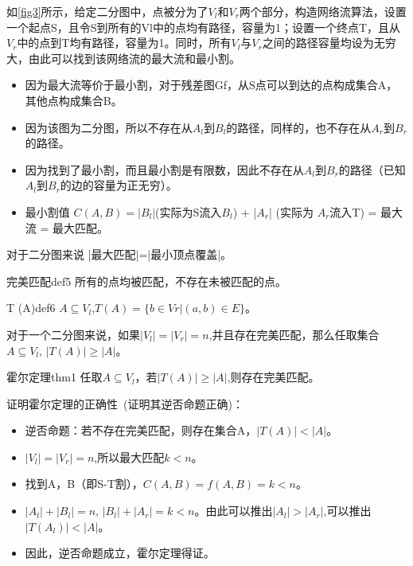 \begin{example}
  如\autoref{fig3}所示，给定二分图中，点被分为了\(V_l\)和\(V_r\)两个部分，构造网络流算法，设置一个起点S，且令S到所有的Vl中的点均有路径，容量为1；设置一个终点T，且从\(V_r\)中的点到T均有路径，容量为1。同时，所有\(V_l\)与\(V_r\)之间的路径容量均设为无穷大，由此可以找到该网络流的最大流和最小割。
\end{example}

\begin{itemize}
  \item 因为最大流等价于最小割，对于残差图Gf，从S点可以到达的点构成集合A，其他点构成集合B。
  \item 因为该图为二分图，所以不存在从\(A_l\)到\(B_l\)的路径，同样的，也不存在从\(A_r\)到\(B_r\)的路径。
  \item 因为找到了最小割，而且最小割是有限数，因此不存在从\(A_l\)到\(B_r\)的路径（已知\(A_l\)到\(B_r\)的边的容量为正无穷）。
  \item 最小割值 \(C(A,B) =|B_l|\)(实际为S流入\(B_l\)) + |\(A_r\)| (实际为 \(A_r\)流入T) = 最大流 = 最大匹配。
\end{itemize}
对于二分图来说 |最大匹配|=|最小顶点覆盖|。

\begin{definition}{完美匹配}{def5}
  所有的点均被匹配，不存在未被匹配的点。
\end{definition}

\begin{definition}{T (A)}{def6}
  \(A \subseteq V_l\),\(T(A) = \{b \in Vr | (a,b) \in E \} \)。
\end{definition}

对于一个二分图来说，如果\(|V_l|=|V_r|=n\),并且存在完美匹配，那么任取集合\(A \subseteq V_l,\,|T(A)| \ge |A|\)。

\begin{theorem}{霍尔定理}{thm1}
  任取\(A \subseteq V_l\)，若\(|T(A)| \ge |A|\),则存在完美匹配。
\end{theorem}
证明霍尔定理的正确性~(证明其逆否命题正确)：
\begin{itemize}
  \item 逆否命题：若不存在完美匹配，则存在集合A，\(|T(A)| < |A|\)。
  \item \(|V_l|=|V_r|=n\),所以最大匹配\(k<n\)。
  \item 找到A，B（即S-T割），\(C(A,B) = f(A,B) = k<n\)。
  \item \(|A_l|+|B_l| = n,\,|B_l|+|A_r| = k < n\)。由此可以推出\(|A_l| > |A_r|\),可以推出\(|T(A_l)| < |A|\)。
  \item 因此，逆否命题成立，霍尔定理得证。
\end{itemize}

